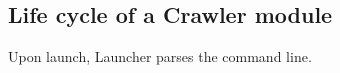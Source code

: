 \subsection{Life cycle of a Crawler module}

Upon launch, Launcher parses the command line.

\begin{figure}
\end{figure}
